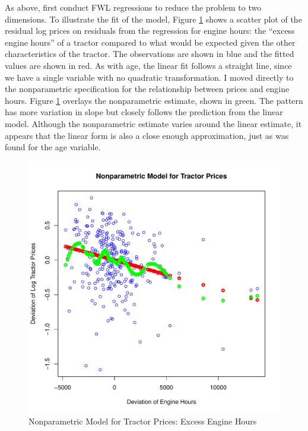 As above, first conduct FWL regressions 
to reduce the problem to two dimensions. 
%
To illustrate the fit of the model, 
Figure \ref{fig:dev_np_vs_eng_dev}
shows a scatter plot 
of the residual log prices on 
residuals from the regression for engine hours:
the ``excess engine hours'' of a tractor compared to what would be 
expected given the other characteristics of the tractor. 
The observations are shown in blue
and the fitted values are shown in red.
As with age, the linear fit follows a straight line,
since we have a single variable with no
quadratic transformation.
% 
I moved directly to the nonparametric specification for 
the relationship between prices and engine hours.
Figure \ref{fig:dev_np_vs_eng_dev} 
overlays the nonparametric estimate, shown in green. 
The pattern has more variation in slope but 
closely follows the prediction from the linear model. 
Although the nonparametric estimate varies around the linear estimate,
it appears that the linear form
is also a close enough approximation, 
just as was found for the age variable.


\begin{figure}[h!]
  \centering
  \includegraphics[scale = 0.5, keepaspectratio=true]{../Figures/dev_np_vs_eng_dev}
  \caption{Nonparametric Model for Tractor Prices: Excess Engine Hours} \label{fig:dev_np_vs_eng_dev}
\end{figure}

